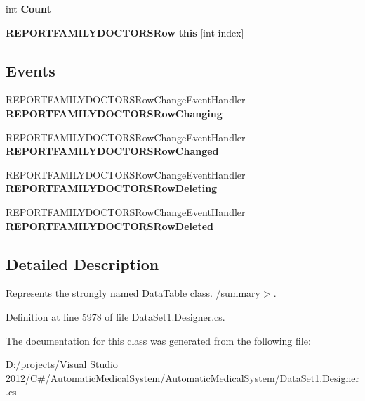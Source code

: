 \begin{CompactItemize}
\item 
int \textbf{Count}\hspace{0.3cm}{\tt  [get]}\label{class_automatic_medical_system_1_1_data_set1_1_1_r_e_p_o_r_t_f_a_m_i_l_y_d_o_c_t_o_r_s_data_table_ff12ad44a312cef434bef952dbd8c5de}

\item 
{\bf REPORTFAMILYDOCTORSRow} \textbf{this} [int index]\hspace{0.3cm}{\tt  [get]}\label{class_automatic_medical_system_1_1_data_set1_1_1_r_e_p_o_r_t_f_a_m_i_l_y_d_o_c_t_o_r_s_data_table_71bf0fe86813b8ad63235748ffd3ebe1}

\end{CompactItemize}
\subsection*{Events}
\begin{CompactItemize}
\item 
REPORTFAMILYDOCTORSRowChangeEventHandler \textbf{REPORTFAMILYDOCTORSRowChanging}\label{class_automatic_medical_system_1_1_data_set1_1_1_r_e_p_o_r_t_f_a_m_i_l_y_d_o_c_t_o_r_s_data_table_ce44f1c09b3aa2fb8febaef29f0de89b}

\item 
REPORTFAMILYDOCTORSRowChangeEventHandler \textbf{REPORTFAMILYDOCTORSRowChanged}\label{class_automatic_medical_system_1_1_data_set1_1_1_r_e_p_o_r_t_f_a_m_i_l_y_d_o_c_t_o_r_s_data_table_5e1f365a4a6a87db7481e4e33e988f54}

\item 
REPORTFAMILYDOCTORSRowChangeEventHandler \textbf{REPORTFAMILYDOCTORSRowDeleting}\label{class_automatic_medical_system_1_1_data_set1_1_1_r_e_p_o_r_t_f_a_m_i_l_y_d_o_c_t_o_r_s_data_table_9e84ccab79693a963e7a925b26c5fa1c}

\item 
REPORTFAMILYDOCTORSRowChangeEventHandler \textbf{REPORTFAMILYDOCTORSRowDeleted}\label{class_automatic_medical_system_1_1_data_set1_1_1_r_e_p_o_r_t_f_a_m_i_l_y_d_o_c_t_o_r_s_data_table_839033c6b52638846ec10ddd1d5467a5}

\end{CompactItemize}


\subsection{Detailed Description}
Represents the strongly named DataTable class. /summary$>$. 

Definition at line 5978 of file DataSet1.Designer.cs.

The documentation for this class was generated from the following file:\begin{CompactItemize}
\item 
D:/projects/Visual Studio 2012/C\#/AutomaticMedicalSystem/AutomaticMedicalSystem/DataSet1.Designer.cs\end{CompactItemize}

